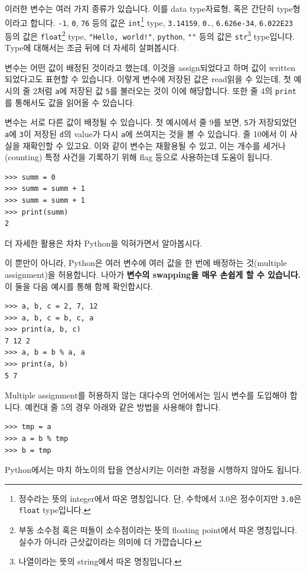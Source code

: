 \documentclass[../main.tex]{subfiles}
\begin{document}
이러한 변수는 여러 가지 종류가 있습니다.
이를 data type자료형, 혹은 간단히 type형이라고 합니다.
\texttt{-1}, \texttt{0}, \texttt{76} 등의 값은 \texttt{int}\footnote{정수라는 뜻의 integer에서 따온 명칭입니다. 단, 수학에서 3.0은 정수이지만 \texttt{3.0}은 \texttt{float} type입니다.} type, \texttt{3.14159}, \texttt{0.}, \texttt{6.626e-34}, \texttt{6.022E23} 등의 값은 \texttt{float}\footnote{부동 소수점 혹은 떠돌이 소수점이라는 뜻의 floating point에서 따온 명칭입니다. 실수가 아니라 근삿값이라는 의미에 더 가깝습니다.} type, \texttt{"Hello, world!"}, \texttt{\textquotesingle python\textquotesingle}, \texttt{""} 등의 값은 \texttt{str}\footnote{나열이라는 뜻의 string에서 따온 명칭입니다.} type입니다.
Type에 대해서는 조금 뒤에 더 자세히 살펴봅시다.

변수는 어떤 값이 배정된 것이라고 했는데, 이것을 assign되었다고 하며 값이 written되었다고도 표현할 수 있습니다.
이렇게 변수에 저장된 값은 read읽을 수 있는데, 첫 예시의 줄 2처럼 \texttt{a}에 저장된 값 \texttt{5}를 불러오는 것이 이에 해당합니다.
또한 줄 4의 \texttt{print}를 통해서도 값을 읽어올 수 있습니다.

변수는 서로 다른 값이 배정될 수 있습니다.
첫 예시에서 줄 9를 보면, \texttt{5}가 저장되었던 \texttt{a}에 \texttt{3}이 저장된 \texttt{d}의 value가 다시 \texttt{a}에 쓰여지는 것을 볼 수 있습니다.
줄 10에서 이 사실을 재확인할 수 있고요.
이와 같이 변수는 재활용될 수 있고, 이는 개수를 세거나(counting) 특정 사건을 기록하기 위해 flag 등으로 사용하는데 도움이 됩니다.
\begin{verbatim}
>>> summ = 0
>>> summ = summ + 1
>>> summ = summ + 1
>>> print(summ)
2
\end{verbatim}
더 자세한 활용은 차차 Python을 익혀가면서 알아봅시다.

이 뿐만이 아니라, Python은 여러 변수에 여러 값을 한 번에 배정하는 것(multiple assignment)을 허용합니다.
나아가 \textbf{변수의 swapping을 매우 손쉽게 할 수 있습니다.}
이 둘을 다음 예시를 통해 함께 확인합시다.
\begin{verbatim}
>>> a, b, c = 2, 7, 12
>>> a, b, c = b, c, a
>>> print(a, b, c)
7 12 2
>>> a, b = b % a, a
>>> print(a, b)
5 7
\end{verbatim}
Multiple assignment를 허용하지 않는 대다수의 언어에서는 임시 변수를 도입해야 합니다.
예컨대 줄 5의 경우 아래와 같은 방법을 사용해야 합니다.
\begin{verbatim}
>>> tmp = a
>>> a = b % tmp
>>> b = tmp
\end{verbatim}
Python에서는 마치 하노이의 탑을 연상시키는 이러한 과정을 시행하지 않아도 됩니다.
\end{document}
